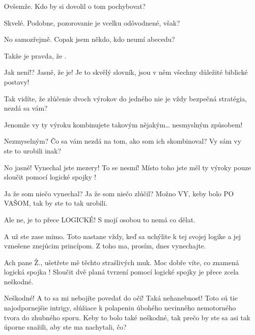 \documentclass[12pt]{article}
\begin{document}
\begin{description}[itemsep=0pt]
\item[A:] Ovšemže. Kdo by si dovolil o tom pochybovat?

\item[Ž:] Skvelé. Podobne, pozorovanie  je vcelku odôvodnené, však?

\item[A:] No samozřejmě. Copak jsem někdo, kdo neumí abecedu?

\item[Ž:] Takže je pravda, že .

\item[A:] Jak není!? Jasně, že je! Je to skvělý slovník, jsou v něm všechny
    důležité biblické postavy!

\item[Ž:] Tak vidíte, že zlúčenie dvoch výrokov do jedného nie je vždy bezpečná stratégia, nezdá sa vám?

\item[A:] Jenomže vy ty výroku kombinujete takovým nějakým… nesmyslným způsobem!

\item[Ž:] Nezmyselným? Čo sa vám nezdá na tom, ako som ich skombinoval? Vy sám vy ste to urobili inak?

\item[A:] No jasně! Vynechal jste mezery! To se nesmí! Místo toho jste měl ty
    výroky pouze sloučit pomocí logické spojky !

\item[Ž:] Ja že som niečo vynechal? Ja že som niečo zlúčil? Možno VY, keby bolo PO VAŠOM, tak by ste to tak urobili.

\item[A:] Ale ne, je to přece LOGICKÉ! S mojí osobou to nemá co dělat.

\item[Ž:] A už ste zase mimo. Toto nastane vždy, keď sa uchýlite k tej svojej logike a jej vznešene znejúcim princípom. Z toho ma, prosím, dnes vynechajte.

\item[A:] Ach pane Ž., ušetřete mě těchto strašlivých muk. Moc dobře víte, co
    znamená logická spojka ! Sloučit dvě planá tvrzení pomocí logické spojky
     je přece zcela neškodné.

\item[Ž:] Neškodné! A to sa mi nebojíte povedať do očí! Taká nehanebnosť! Toto sú tie najodpornejšie intrigy, slúžiace k polapeniu úbohého nevinného nemotorného tvora do zhubného sporu. Keby to bolo také neškodné, tak prečo by ste sa asi tak úporne snažili, aby ste ma nachytali, čo?


\end{description}
\end{document}
